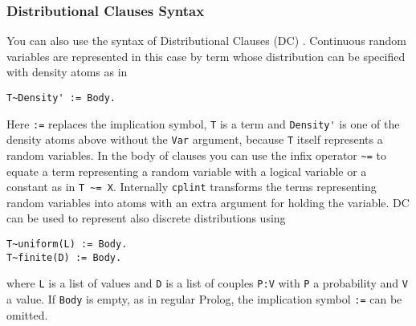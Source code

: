 \subsubsection{Distributional Clauses Syntax}
\label{dc}
You can also use the syntax of Distributional Clauses (DC) \cite{Nitti2016}.
Continuous random variables are represented in this case by term whose distribution can be specified with density atoms as in
\begin{verbatim}
T~Density' := Body.
\end{verbatim}
Here \verb|:=| replaces the implication symbol, \verb|T| is a term and \verb|Density'| is one of the density atoms above without the \verb|Var| argument, because \verb|T|
itself represents a random variables. In the body of clauses you can use the infix operator \verb|~=| to equate a term representing a random variable with a logical variable or
a constant as in \verb|T ~= X|. Internally \verb|cplint| transforms the terms representing random variables into atoms with an extra argument for holding the variable.
DC can be used to represent also discrete distributions using
\begin{verbatim}
T~uniform(L) := Body.
T~finite(D) := Body.
\end{verbatim} 
where \verb|L| is a list of values and \verb|D| is a list of couples \verb|P:V| with \verb|P| a probability and \verb|V| a value.
If \verb|Body| is empty, as in regular Prolog, the implication symbol \verb|:=| can be omitted.

